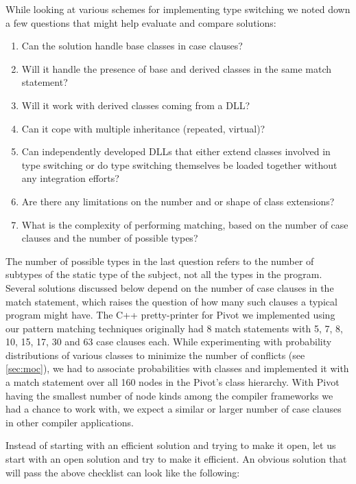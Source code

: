 \documentclass[preprint]{sigplanconf}
\begin{document}
While looking at various schemes for implementing type switching we noted down a 
few questions that might help evaluate and compare solutions: 

\begin{enumerate}
\setlength{\itemsep}{0pt}
\setlength{\parskip}{0pt}
\item Can the solution handle base classes in case clauses?
\item Will it handle the presence of base and derived classes in the same match statement?
\item Will it work with derived classes coming from a DLL?
\item Can it cope with multiple inheritance (repeated, virtual)?
\item Can independently developed DLLs that either extend classes involved in 
      type switching or do type switching themselves be loaded together without 
      any integration efforts?
\item Are there any limitations on the number and or shape of class extensions?
\item What is the complexity of performing matching, based on the number of case clauses and 
      the number of possible types?
\end{enumerate}

The number of possible types in the last question refers to the number of subtypes 
of the static type of the subject, not all the types in the program. Several 
solutions discussed below depend on the number of case clauses in the match 
statement, which raises the question of how many such clauses a typical program 
might have. The C++ pretty-printer for Pivot we implemented using our pattern 
matching techniques originally had 8 match statements with 5, 7, 8, 10, 15, 17, 30 
and 63 case clauses each. While experimenting 
with probability distributions of various classes to minimize the number of 
conflicts (see \textsection\ref{sec:moc}), we had to associate probabilities 
with classes and implemented it with a match statement over all 160 nodes in the 
Pivot's class hierarchy. With Pivot having the smallest number of node kinds 
among the compiler frameworks we had a chance to work with, we expect a similar 
or larger number of case clauses in other compiler applications.

Instead of starting with an efficient solution and trying to make it open, let us 
start with an open solution and try to make it efficient. 
An obvious solution that will pass the above checklist can look like the following:
\end{document}
